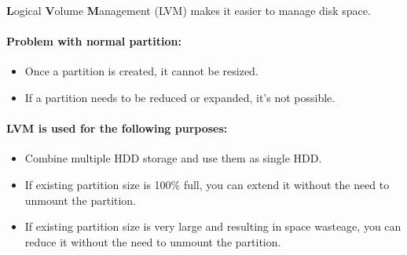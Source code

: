 \setlength{\columnsep}{3pt}
\begin{flushleft}
	\bigskip
	\textbf{L}ogical \textbf{V}olume \textbf{M}anagement (LVM) makes it easier to manage disk space. 
\bigskip

\paragraph{Problem with normal partition:}
	\begin{itemize}
		\item Once a partition is created, it cannot be resized. 
		\item If a partition needs to be reduced or expanded, it's not possible.	
	\end{itemize}

\bigskip

\paragraph{LVM is used for the following purposes:}
\begin{itemize}
	\item Combine multiple HDD storage and use them as single HDD.
	\item If existing partition size is 100\% full, you can extend it without the need to unmount the partition.
	\item If existing partition size is very large and resulting in space wasteage, you can reduce it without the need to unmount the partition.
\end{itemize}

	
\end{flushleft}

\newpage

